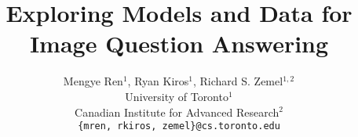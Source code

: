 

\author{
Mengye Ren${}^1$, Ryan Kiros${}^1$, Richard S. Zemel${}^{1, 2}$\\
University of Toronto${}^1$\\
Canadian Institute for Advanced Research${}^2$\\
\texttt{\{mren, rkiros, zemel\}@cs.toronto.edu}
}
\title{Exploring Models and Data for Image Question Answering}


\maketitle


